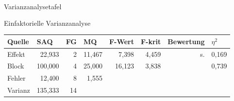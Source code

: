 \documentclass{beamer}
\begin{document}
	\begin{frame}{Varianzanalysetafel}
		\begin{block}{Einfaktorielle Varianzanalyse}
				\begin{table}[]
					\centering
					\resizebox{\textwidth}{!} {
					\begin{tabular}{|l|r|r|r|r|r|r|r|}
						\hline
						Quelle  & \multicolumn{1}{l|}{SAQ} & \multicolumn{1}{l|}{FG} & \multicolumn{1}{l|}{MQ} & \multicolumn{1}{l|}{F-Wert} & \multicolumn{1}{l|}{F-krit} & \multicolumn{1}{l|}{Bewertung} & \multicolumn{1}{l|}{$\eta^2$} \\ \hline
						Effekt  & 22,933                   & 2                       & 11,467                  & 7,398                       & 4,459                       & s.                              & 0,169                         \\ \hline
						Block   & 100,000                  & 4                       & 25,000                  & 16,123                      & 3,838                       &                                & 0,739                         \\ \hline
						Fehler  & 12,400                   & 8                       & 1,555                   &                             &                             &                                &                               \\ \hline
						Varianz & 135,333                  & 14                      &                         &                             &                             &                                &                               \\ \hline
					\end{tabular}
				}
				\end{table}
		\end{block}
	\end{frame}
	
	
\end{document}
